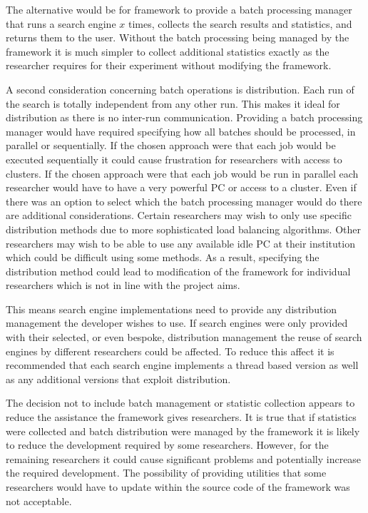 The alternative would be for framework to provide a batch processing manager that runs a search engine $x$ times, collects the search results and statistics, and returns them to the user.
Without the batch processing being managed by the framework it is much simpler to collect additional statistics exactly as the researcher requires for their experiment without modifying the framework.

A second consideration concerning batch operations is distribution.
Each run of the search is totally independent from any other run.
This makes it ideal for distribution as there is no inter-run communication.
Providing a batch processing manager would have required specifying how all batches should be processed, in parallel or sequentially.
If the chosen approach were that each job would be executed sequentially it could cause frustration for researchers with access to clusters.
If the chosen approach were that each job would be run in parallel each researcher would have to have a very powerful PC or access to a cluster.
Even if there was an option to select which the batch processing manager would do there are additional considerations.
Certain researchers may wish to only use specific distribution methods due to more sophisticated load balancing algorithms.
Other researchers may wish to be able to use any available idle PC at their institution which could be difficult using some methods.
As a result, specifying the distribution method could lead to modification of the framework for individual researchers which is not in line with the project aims.

This means search engine implementations need to provide any distribution management the developer wishes to use.
If search engines were only provided with their selected, or even bespoke, distribution management the reuse of search engines by different researchers could be affected.
To reduce this affect it is recommended that each search engine implements a thread based version as well as any additional versions that exploit distribution.

The decision not to include batch management or statistic collection appears to reduce the assistance the framework gives researchers.
It is true that if statistics were collected and batch distribution were managed by the framework it is likely to reduce the development required by some researchers.
However, for the remaining researchers it could cause significant problems and potentially increase the required development.
The possibility of providing utilities that some researchers would have to update within the source code of the framework was not acceptable.

